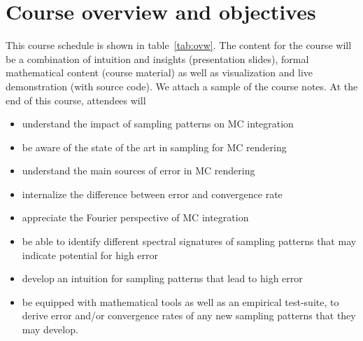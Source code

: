 \documentclass{acmsiggraph}
\begin{document}
\section{Course overview and objectives}
This course schedule is shown in table~\ref{tab:ovw}. The content for the course will be a combination of intuition and insights (presentation slides), formal mathematical content (course material) as well as visualization and live demonstration (with source code). We attach a sample of the course notes.
At the end of this course, attendees will 
\begin{itemize}[noitemsep,topsep=-1em,leftmargin=*]
\item understand the impact of sampling patterns on MC integration
\item be aware of the state of the art in sampling for MC rendering
\item understand the main sources of error in MC rendering 
\item internalize the difference between error and convergence rate
\item appreciate the Fourier perspective of MC integration
\item be able to identify different spectral signatures of sampling patterns that may indicate potential for high error
\item develop an intuition for sampling patterns that lead to high error
\item be equipped with mathematical tools as well as an empirical test-suite, to derive error and/or convergence rates of any new sampling patterns that they may develop.
\end{itemize}






\end{document}
